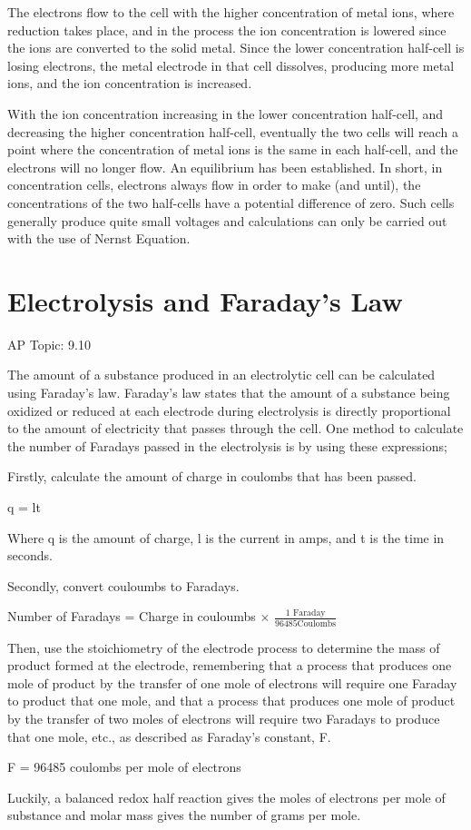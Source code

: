 \documentclass[../chem.tex]{subfiles}
\begin{document}
The electrons flow to the cell with the higher concentration of metal ions, where reduction takes place, and in the process the ion concentration 
is lowered since the ions are converted to the solid metal. Since the lower concentration half-cell is losing electrons, the metal electrode in that cell dissolves, 
producing more metal ions, and the ion concentration is increased.

With the ion concentration increasing in the lower concentration half-cell, and decreasing the higher concentration half-cell, eventually 
the two cells will reach a point where the concentration of metal ions is the same in each half-cell, and the electrons will no longer flow. An 
equilibrium has been established. In short, in concentration cells, electrons always flow in order to make (and until), the concentrations of the two 
half-cells have a potential difference of zero. Such cells generally produce quite small voltages and calculations can only be carried out with the use 
of Nernst Equation.
\section{Electrolysis and Faraday's Law}
AP Topic: 9.10

The amount of a substance produced in an electrolytic cell can be calculated using Faraday's law. Faraday's law states that the amount 
of a substance being oxidized or reduced at each electrode during electrolysis is directly proportional to the amount of electricity 
that passes through the cell. One method to calculate the number of Faradays passed in the electrolysis is by using these expressions;

Firstly, calculate the amount of charge in coulombs that has been passed.
\begin{center}
    q = lt 
\end{center}
Where q is the amount of charge, l is the current in amps, and t is the time in seconds.

Secondly, convert couloumbs to Faradays.
\begin{center}
    Number of Faradays = Charge in couloumbs $\times$ $\frac{1\text{ Faraday}}{96485 \text{Coulombs}}$
\end{center}

Then, use the stoichiometry of the electrode process to determine the mass of product formed at the electrode, remembering that a process
that produces one mole of product by the transfer of one mole of electrons will require one Faraday to product that one mole, and that a process that produces 
one mole of product by the transfer of two moles of electrons will require two Faradays to produce that one mole, etc., as described as Faraday's constant, F.
\begin{center}
    F = 96485 coulombs per mole of electrons 
\end{center}
Luckily, a balanced redox half reaction gives the moles of electrons per mole of substance and molar mass gives the number of grams per mole. 
\end{document}
